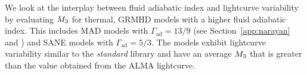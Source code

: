 We look at the interplay between fluid adiabatic index and lightcurve variability by evaluating $M_{3}$ for thermal, GRMHD models with a higher fluid adiabatic index. This includes MAD models with $\Gamma_\mathrm{ad}=13/9$ (see Section~\ref{app:narayan} and  \citealt{2021arXiv210812380N}) and SANE models with $\Gamma_\mathrm{ad}=5/3$. The models exhibit lightcurve variability similar to the \textit{standard} library and have an average $M_{3}$ that is greater than the value obtained from the ALMA lightcurve.
